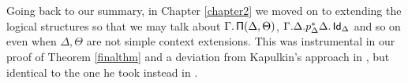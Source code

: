 Going back to our summary, in Chapter \ref{chapter2} we moved on to extending
the logical structures so that we may talk about $\Gamma.\operatorname{\mathsf{\Pi}}(\Delta,\Theta)$,
$\Gamma.\Delta.p^*_\Delta\Delta.\operatorname{\mathsf{Id}}_\Delta$ and so on even when $\Delta,\Theta$
are not simple context extensions. This was instrumental in our proof of Theorem
\ref{finalthm} and a deviation from Kapulkin's approach in \cite{Kap14}, but
identical to the one he took instead in \cite{Kap17}.
